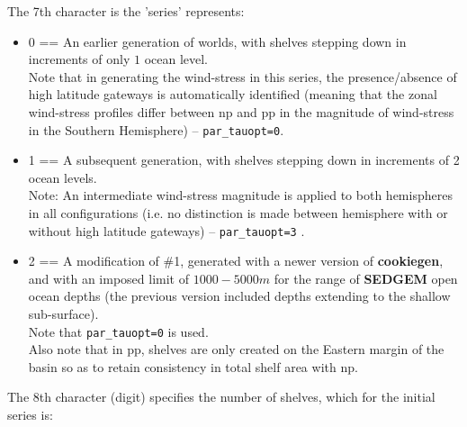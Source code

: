 The 7th character is the 'series' represents:
\begin{itemize}[noitemsep]
\vspace{1mm}
\item \textsf{\footnotesize 0} == An earlier generation of worlds, with shelves stepping down in increments of only \(1\) ocean level.
\\Note that in generating the wind-stress in this series, the presence/absence of high latitude gateways is automatically identified (meaning that the zonal wind-stress profiles differ between \textsf{\footnotesize np} and \textsf{\footnotesize pp} in the magnitude of wind-stress in the Southern Hemisphere) -- \texttt{par\_tauopt=0}.
\vspace{1mm}
\item \textsf{\footnotesize 1} == A subsequent generation, with shelves stepping down in increments of 2 ocean levels.
\\Note: An intermediate wind-stress magnitude is applied to both hemispheres in all configurations (i.e. no distinction is made between hemisphere with or without high latitude gateways) -- \texttt{par\_tauopt=3} .
\vspace{1mm}
\item \textsf{\footnotesize 2} == A modification of \#1,  generated with a newer version of \textbf{cookiegen}, and with an imposed limit of \(1000-5000 m\) for the range of \textbf{SEDGEM} open ocean depths (the previous version included   depths extending to the shallow sub-surface).
\\Note that \texttt{par\_tauopt=0} is used. 
\\Also note that in \textsf{\footnotesize pp}, shelves are only created on the Eastern margin of the basin so as to retain consistency in total shelf area with  \textsf{\footnotesize np}.
\end{itemize}
\vspace{2mm}

The 8th character (digit) specifies the number of shelves, which for the initial series is:

